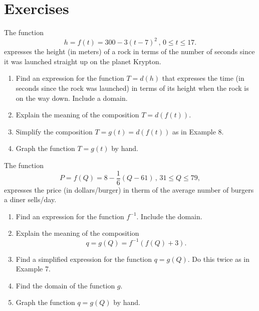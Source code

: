 \documentclass{ximera}
\begin{document}
\section{Exercises}

\begin{exercise} \label{Ec3mbmaq}
The function
\[
  h = f(t) = 300 - 3(t-7)^2 \, , \, 0\leq t \leq 17.
\]
expresses the height (in meters) of a rock in terms of the number of seconds since it was launched straight up on the planet Krypton. %

 


\begin{enumerate}
\item Find an expression for the function $T=d(h)$ that expresses the time (in seconds since the rock was launched) in terms of its height when the rock is on the way down. Include a domain.

\item Explain the meaning of the composition $T=d(f(t))$.

\item Simplify the composition $T = g(t) =d(f(t))$ as in Example 8.

\item Graph the function $T = g(t)$ by hand.
\end{enumerate}
\end{exercise}


\begin{exercise} \label{Efe000111}
The function 
\[
      P = f(Q) = 8 - \frac{1}{6}\left( Q - 61 \right) \, , \, 31 \leq Q \leq 79 , 
\]
expresses the price (in dollars/burger) in therm of the average number of burgers a diner sells/day.

\begin{enumerate}
\item Find an expression for the function $f^{-1}$. Include the domain.

\item Explain the meaning of the composition
\[
      q = g(Q) = f^{-1}(f(Q) + 3).
\]

\item Find a simplified expression for the function $q=g(Q)$. Do this twice as in Example 7.

\item Find the domain of the function $g$.

\item Graph the function $q=g(Q)$ by hand.
\end{enumerate}
\end{exercise}
\end{document}
